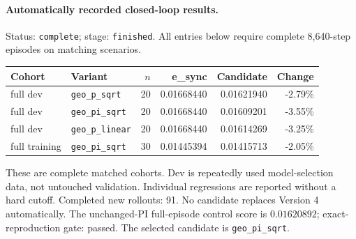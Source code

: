 \paragraph{Automatically recorded closed-loop results.}
Status: \texttt{complete}; stage: \texttt{finished}.
All entries below require complete 8,640-step episodes on matching scenarios.
\begin{center}\small
\begin{tabular}{llrrrr}\toprule
Cohort & Variant & $n$ & e\_sync & Candidate & Change \\\midrule
full dev & \texttt{geo\_p\_sqrt} & 20 & 0.01668440 & 0.01621940 & -2.79\% \\
full dev & \texttt{geo\_pi\_sqrt} & 20 & 0.01668440 & 0.01609201 & -3.55\% \\
full dev & \texttt{geo\_p\_linear} & 20 & 0.01668440 & 0.01614269 & -3.25\% \\
full training & \texttt{geo\_pi\_sqrt} & 30 & 0.01445394 & 0.01415713 & -2.05\% \\
\bottomrule\end{tabular}\end{center}
These are complete matched cohorts. Dev is repeatedly used model-selection data, not untouched validation. Individual regressions are reported without a hard cutoff.
Completed new rollouts: 91. No candidate replaces Version 4 automatically.
The unchanged-PI full-episode control score is $0.01620892$; exact-reproduction gate: passed.
The selected candidate is \texttt{geo\_pi\_sqrt}.
